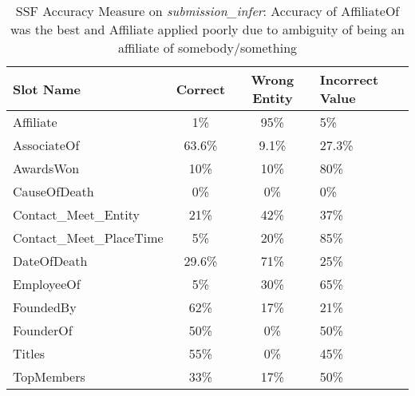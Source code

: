 \begin{table}[h]
\caption{SSF Accuracy Measure on \textit{submission\_infer}: Accuracy of AffiliateOf was the best and Affiliate applied poorly due to ambiguity of being an affiliate of somebody/something}
\centering
\label{table:finalresultaccuracy}
\begin{tabular}{|l|c|c|p{13mm}|}
\hline 
 \textbf{Slot Name}  & \textbf{Correct} & \textbf{Wrong Entity} & {\small \textbf{Incorrect Value}} \\ 
\hline 
Affiliate & 1\% & 95\% & 5\% \\ \hline 
AssociateOf & 63.6\% & 9.1\% & 27.3\%  \\ \hline 
AwardsWon & 10\% & 10\% & 80\%  \\ \hline 
CauseOfDeath & 0\% & 0\% & 0\%  \\ \hline 
{\tiny Contact\_Meet\_Entity} & 21\% & 42\% & 37\%  \\ \hline 
{\tiny Contact\_Meet\_PlaceTime} & 5\% & 20\% & 85\%  \\ \hline 
DateOfDeath & 29.6\% & 71\% & 25\%  \\ \hline 
EmployeeOf & 5\% & 30\% & 65\%  \\ \hline 
FoundedBy & 62\% & 17\% & 21\%  \\ \hline 
FounderOf & 50\% & 0\% & 50\%  \\ \hline 
Titles & 55\% & 0\% & 45\%  \\ \hline 
TopMembers & 33\% & 17\% & 50\%  \\ \hline 

\end{tabular} 
\end{table}









